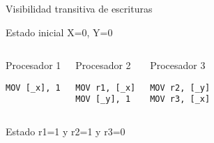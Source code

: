 \begin{frame}[t,fragile]{Visibilidad transitiva de escrituras}

\begin{block}{Estado inicial}
X=0, Y=0
\end{block}


\begin{columns}[T]


\begin{block}{Procesador 1}
\begin{lstlisting}[language={[x86masm]Assembler}]
MOV [_x], 1
\end{lstlisting}
\end{block}

\begin{block}{Procesador 2}
\begin{lstlisting}[language={[x86masm]Assembler}]
MOV r1, [_x]
MOV [_y], 1
\end{lstlisting}
\end{block}

\begin{block}{Procesador 3}
\begin{lstlisting}[language={[x86masm]Assembler}]
MOV r2, [_y]
MOV r3, [_x]
\end{lstlisting}
\end{block}

\end{columns}


\begin{block}{Estado }
r1=1 y r2=1 y r3=0
\end{block}

\end{frame}




